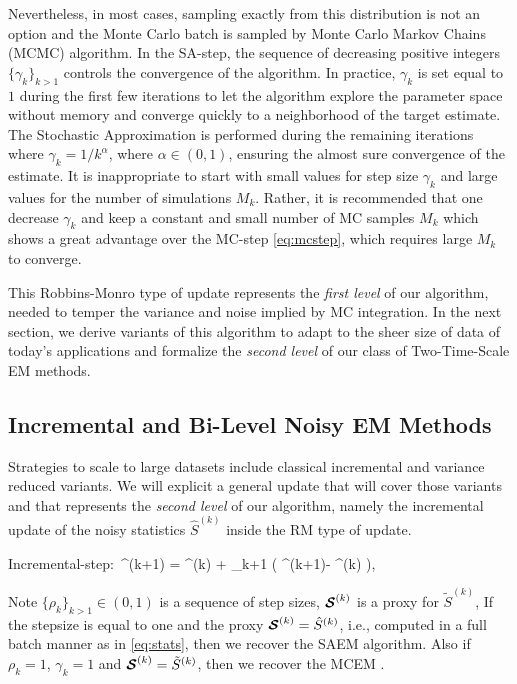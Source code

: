 \documentclass[11pt]{article}
\theoremstyle{t}
\begin{document}
Nevertheless, in most cases, sampling exactly from this distribution is not an option and the Monte Carlo batch is sampled by Monte Carlo Markov Chains (MCMC) algorithm.
In the \textsf{SA-step}, the sequence of decreasing positive integers $\{ \gamma_{k} \}_{k>1}$ controls the convergence of the algorithm.
 In practice, $\gamma_k$ is set equal to $1$ during the first few iterations to let the algorithm explore the parameter space without memory and converge quickly to a neighborhood of the target estimate. 
 The Stochastic Approximation is performed during the remaining iterations where $\gamma_k = 1/k^\alpha$, where $\alpha \in (0,1)$, ensuring the almost sure convergence of the estimate.
 It is inappropriate to start with small values for step size $\gamma_k$ and large values for the number of simulations $M_k$. Rather, it is recommended that one decrease $\gamma_k$ and keep a constant and small number of MC samples $M_k$ which shows a great advantage over the \textsf{MC-step} \eqref{eq:mcstep}, which requires large $M_k$ to converge.



This Robbins-Monro type of update represents the \textit{first level} of our algorithm, needed to temper the variance and noise implied by MC integration.
In the next section, we derive variants of this algorithm to adapt to the sheer size of data of today's applications and formalize the \textit{second level} of our class of Two-Time-Scale EM methods.

\subsection{Incremental and Bi-Level Noisy EM Methods} \label{sec:sEM}
Strategies to scale to large datasets include classical incremental and variance reduced variants.
We will explicit a general update that will cover those variants and that represents the \textit{second level} of our algorithm, namely the incremental update of the noisy statistics $\hat{S}^{(k)}$ inside the RM type of update.

\beq \label{eq:sestep}
\textsf{Incremental-step}:~^{(k+1)} = ^{(k)} + \rho_{k+1} \big( \StocEstep^{(k+1)}- ^{(k)}  \big),
\eeq

Note $\{ \rho_{k} \}_{k>1} \in (0,1)$ is a sequence of step sizes, ${\bm{\mathcal{S}}}^{(k)}$ is a proxy for $\tilde{S}^{(k)}$,
If the stepsize is equal to one and the proxy ${\bm{\mathcal{S}}}^{(k)} = \hat{S}^{(k)}$, i.e., computed in a full batch manner as in \eqref{eq:stats}, then we recover the SAEM algorithm.
Also if $\rho_{k}=1$, $\gamma_{k}=1$ and ${\bm{\mathcal{S}}}^{(k)} = \tilde{S}^{(k)}$, then we recover the MCEM \citep{wei1990monte}.
\end{document}
